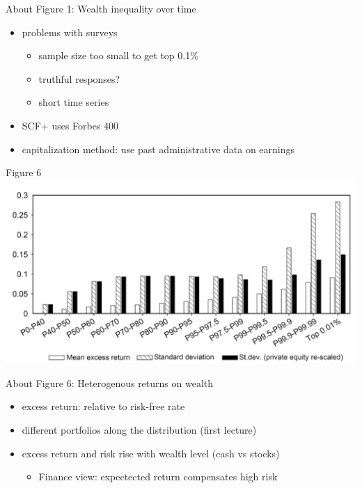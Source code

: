 \documentclass[aspectratio=169,mathserif]{beamer}
\begin{document}
\begin{frame}{About Figure 1: Wealth inequality over time}

    \begin{itemize}
        \item problems with surveys
        \begin{itemize}
            \item sample size too small to get top 0.1\%
            \item truthful responses?
            \item short time series
        \end{itemize}
        \item SCF+ uses Forbes 400
        \item capitalization method: use past administrative data on earnings
    \end{itemize}
    
\end{frame}

\begin{frame}{Figure 6}
    \centering
    \includegraphics[scale = 0.5]{HKS_Fig_6.png}
\end{frame}

\begin{frame}{About Figure 6: Heterogenous returns on wealth}

    \begin{itemize}
        \item excess return: relative to risk-free rate
        \item different portfolios along the distribution (first lecture)
       
        \item excess return and risk rise with wealth level (cash vs stocks)
        \begin{itemize}
         \item Finance view: expectected return compensates high risk
        \end{itemize}
    \end{itemize}
    
\end{frame}
\end{document}
